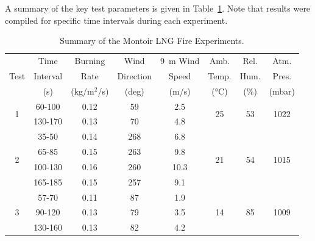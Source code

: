 A summary of the key test parameters is given in Table~\ref{Montoir_Summary}. Note that results were compiled for specific time intervals during each experiment.

\begin{table}[!ht]
\centering
\caption[Summary of the Montoir LNG Fire Experiments]{Summary of the Montoir LNG Fire Experiments.}
\label{Montoir_Summary}
\begin{tabular}{|c|c|c|c|c|c|c|c|}
\hline
                            & Time    & Burning      & Wind      & 9~m Wind & Amb.                & Rel.                & Atm.                    \\
Test                        & Interval& Rate         & Direction & Speed    & Temp.               & Hum.                & Pres.                   \\
                            & (s)     & (kg/m$^2$/s) & (deg)     & (m/s)    & (\unit{\degreeCelsius})         & (\%)                & (mbar)                  \\ \hline \hline
\multirow{2}{*}{1}          & 60-100  & 0.12         & 59        & 2.5      & \multirow{2}{*}{25} & \multirow{2}{*}{53} & \multirow{2}{*}{1022}   \\
                            & 130-170 & 0.13         & 70        & 4.8      &                     &                     &                         \\ \hline
\multirow{4}{*}{2}          & 35-50   & 0.14         & 268       & 6.8      & \multirow{4}{*}{21} & \multirow{4}{*}{54} & \multirow{4}{*}{1015}   \\
                            & 65-85   & 0.15         & 263       & 9.8      &                     &                     &                         \\
                            & 100-130 & 0.16         & 260       & 10.3     &                     &                     &                         \\
                            & 165-185 & 0.15         & 257       & 9.1      &                     &                     &                         \\ \hline
\multirow{3}{*}{3}          & 57-70   & 0.11         & 87        & 1.9      & \multirow{3}{*}{14} & \multirow{3}{*}{85} & \multirow{3}{*}{1009}   \\
                            & 90-120  & 0.13         & 79        & 3.5      &                     &                     &                         \\
                            & 130-160 & 0.13         & 82        & 4.2      &                     &                     &                         \\ \hline
\end{tabular}
\end{table}

